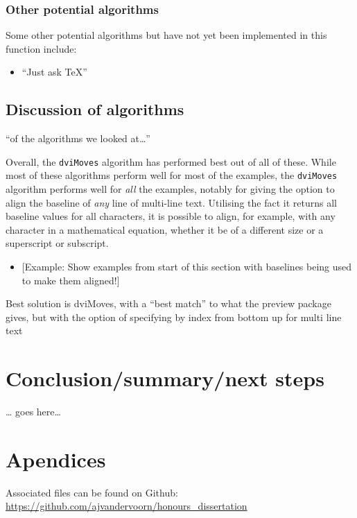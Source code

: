\documentclass[]{article}
\providecommand{\tightlist}{%
  \setlength{\itemsep}{0pt}\setlength{\parskip}{0pt}}
\begin{document}
\subsubsection{Other potential
algorithms}\label{other-potential-algorithms}

Some other potential algorithms but have not yet been implemented in
this function include:

\begin{itemize}
\tightlist
\item
  ``Just ask \TeX{}''
\end{itemize}

\subsection{Discussion of algorithms}\label{discussion-of-algorithms}

``of the algorithms we looked at\ldots{}''

Overall, the \texttt{dviMoves} algorithm has performed best out of all
of these. While most of these algorithms perform well for most of the
examples, the \texttt{dviMoves} algorithm performs well for \emph{all}
the examples, notably for giving the option to align the baseline of
\emph{any} line of multi-line text. Utilising the fact it returns all
baseline values for all characters, it is possible to align, for
example, with any character in a mathematical equation, whether it be of
a different size or a superscript or subscript.

\begin{itemize}
\tightlist
\item
  {[}Example: Show examples from start of this section with baselines
  being used to make them aligned!{]}
\end{itemize}

Best solution is dviMoves, with a ``best match'' to what the preview
package gives, but with the option of specifying by index from bottom up
for multi line text

\newpage{}

\section{Conclusion/summary/next
steps}\label{conclusionsummarynext-steps}

\ldots{} goes here\ldots{}

\newpage{}

\section{Apendices}\label{apendices}

Associated files can be found on Github:
\url{https://github.com/ajvandervoorn/honours_dissertation}
\end{document}
